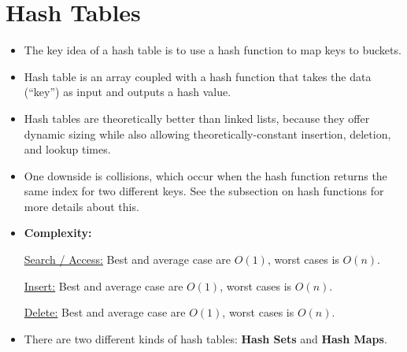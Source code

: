 \documentclass[12pt]{article}
\newcommand{\vsp}{\vspace{0.75mm}}
\begin{document}
	\section*{Hash Tables}
	\label{sec:HashTable}
	{}
	\begin{itemize}[topsep=3mm]
		\item The key idea of a hash table is to use a hash function to map keys to buckets. 
		\item Hash table is an array coupled with a hash function that takes the data (``key'') as input and outputs a hash value.
		\item Hash tables are theoretically better than linked lists, because they offer dynamic sizing while also allowing theoretically-constant insertion, deletion, and lookup times.
		\item One downside is collisions, which occur when the hash function returns the same index for two different keys. See the subsection on hash functions for more details about this.
		\item \textbf{Complexity:}
		
		\ul{Search / Access:} Best and average case are $O(1)$, worst cases is $O(n)$.\vsp
		
		\ul{Insert:} Best and average case are $O(1)$, worst cases is $O(n)$.\vsp
		
		\ul{Delete:} Best and average case are $O(1)$, worst cases is $O(n)$.\vsp
		
		\item There are two different kinds of hash tables: \textbf{Hash Sets} and \textbf{Hash Maps}.
	\end{itemize}
\end{document}

